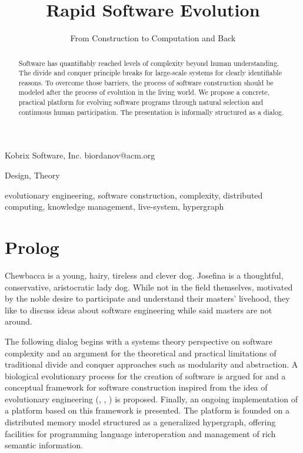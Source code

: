 \documentclass[10pt]{sigplanconf}
\begin{document}
\copyrightdata{[to be supplied]} 


\title{Rapid Software Evolution}
\subtitle{From Construction to Computation and Back}

           {Kobrix Software, Inc.}
           {biordanov@acm.org}

\maketitle

\begin{abstract}
Software has quantifiably reached levels of complexity beyond human understanding. The divide and conquer principle breaks for large-scale systems for clearly identifiable reasons. To overcome those barriers, the process of software construction should be modeled after the process of evolution in the living world. We propose a concrete, practical platform for evolving software programs through natural selection and continuous human participation. The presentation is informally structured as a dialog.
\end{abstract}


\terms
Design, Theory

\keywords
evolutionary engineering, software construction, complexity, distributed computing, knowledge management, live-system, hypergraph

\section{Prolog}

Chewbacca is a young, hairy, tireless and clever dog. Josefina is a thoughtful, conservative, aristocratic lady dog. While not in the field themselves, motivated by the noble desire to participate and understand their masters' livehood, they like to discuss ideas about software engineering while said masters are not around.

The following dialog begins with a systems theory perspective on software complexity and an argument for the theoretical and practical limitations of traditional divide and conquer approaches such as modularity and abstraction. A biological evolutionary process for the creation of software is argued for and a conceptual framework for software construction inspired from the idea of evolutionary engineering (\cite{baryam:2}, \cite{baryam:3}, \cite{braha}) is proposed. Finally, an ongoing implementation of a platform based on this framework is presented. The platform is founded on a distributed memory model structured as a generalized hypergraph, offering facilities for programming language interoperation and management of rich semantic information.
\end{document}
